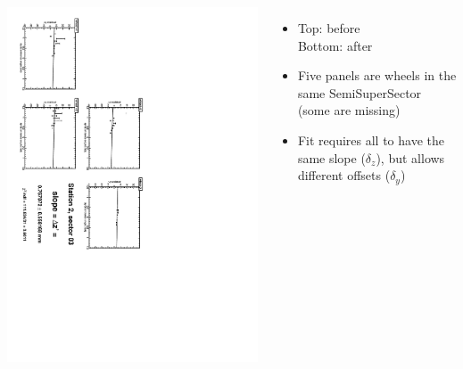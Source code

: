\documentclass[compress]{beamer}
\begin{document}
\begin{frame}
\begin{columns}
\vfill
\includegraphics[height=\linewidth, angle=90]{zfits_after/zfit_2_03.pdf}
\begin{itemize}
\item Top: before \\ Bottom: after
\item Five panels are wheels in the same SemiSuperSector (some are missing)
\item Fit requires all to have the same slope ($\delta_z$), but allows different offsets ($\delta_y$)
\end{itemize}
\end{columns}
\end{frame}
\end{document}

